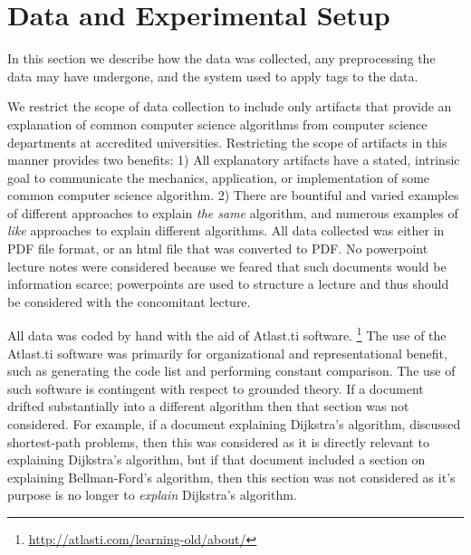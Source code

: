 \documentclass[sigconf]{acmart}
\begin{document}
%


\section{Data and Experimental Setup}
\label{sec:exp:data}

In this section we describe how the data was collected, any preprocessing the
data may have undergone, and the system used to apply tags to the data. 

We restrict the scope of data collection to include only artifacts that provide
an explanation of common computer science algorithms from computer science
departments at accredited universities. Restricting the scope of artifacts in
this manner provides two benefits: 1) All explanatory artifacts have a stated,
intrinsic goal to communicate the mechanics, application, or implementation of
some common computer science algorithm. 2) There are bountiful and varied
examples of different approaches to explain \emph{the same} algorithm, and
numerous examples of \emph{like} approaches to explain different algorithms. All
data collected was either in PDF file format, or an html file that was converted
to PDF. No powerpoint lecture notes were considered because we feared that such
documents would be information scarce; powerpoints are used to structure a
lecture and thus should be considered with the concomitant lecture.

All data was coded by hand with the aid of Atlast.ti software.%
\footnote{\url{http://atlasti.com/learning-old/about/}}
%
The use of the Atlast.ti software was primarily for organizational and
representational benefit, such as generating the code list and performing
constant comparison.
%
The use of such software is contingent with respect to grounded theory.
%
If a document drifted substantially into a different algorithm then that
section was not considered. For example, if a document explaining Dijkstra's
algorithm, discussed shortest-path problems, then this was considered as it is
directly relevant to explaining Dijkstra's algorithm, but if that document
included a section on explaining Bellman-Ford's algorithm, then this section
was not considered as it's purpose is no longer to \emph{explain} Dijkstra's
algorithm.
\end{document}
